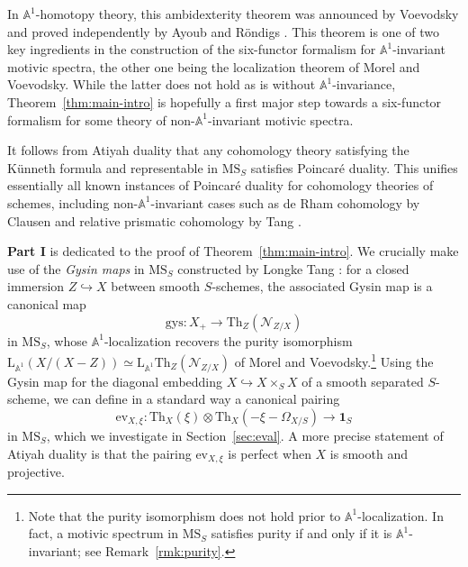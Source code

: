 \documentclass{amsart}
\numberwithin{equation}{section}
\theoremstyle{plain}
\theoremstyle{definition}
\let\scr=\mathcal
\let\bb=\mathbb
\def\A{\bb A}
\def\1{\mathbf 1}
\def\L{\mathrm{L}{}}
\let\into=\hookrightarrow
\def\Th{\mathrm{Th}}
\def\MS{\mathrm{MS}}
\def\ev{\mathrm{ev}}
\def\gys{\mathrm{gys}{}}
\begin{document}
In $\A^1$-homotopy theory, this ambidexterity theorem was announced by Voevodsky \cite{Voevodsky-6FF} and proved independently by Ayoub \cite{Ayoub} and Röndigs \cite{RondigsSH}. This theorem is one of two key ingredients in the construction of the six-functor formalism for $\A^1$-invariant motivic spectra, the other one being the localization theorem of Morel and Voevodsky. While the latter does not hold as is without $\A^1$-invariance, Theorem~\ref{thm:main-intro} is hopefully a first major step towards a six-functor formalism for some theory of non-$\A^1$-invariant motivic spectra.

It follows from Atiyah duality that any cohomology theory satisfying the Künneth formula and representable in $\MS_S$ satisfies Poincaré duality.
This unifies essentially all known instances of Poincaré duality for cohomology theories of schemes, including non-$\A^1$-invariant cases such as de Rham cohomology by Clausen \cite{Cla21} and relative prismatic cohomology by Tang \cite{Tan22}.

\textbf{Part I} is dedicated to the proof of Theorem~\ref{thm:main-intro}.
We crucially make use of the \emph{Gysin maps} in $\MS_S$ constructed by Longke Tang \cite{Tang}: for a closed immersion $Z\into X$ between smooth $S$-schemes, the associated Gysin map is a canonical map
\[
\gys\colon X_+ \to \Th_Z(\scr N_{Z/X})
\]
in $\MS_S$, whose $\A^1$-localization recovers the purity isomorphism $\L_{\A^1}(X/(X-Z))\simeq \L_{\A^1}\Th_Z(\scr N_{Z/X})$ of Morel and Voevodsky.\footnote{Note that the purity isomorphism does not hold prior to $\A^1$-localization. In fact, a motivic spectrum in $\MS_S$ satisfies purity if and only if it is $\A^1$-invariant; see Remark~\ref{rmk:purity}.} Using the Gysin map for the diagonal embedding $X\into X\times_S X$ of a smooth separated $S$-scheme, we can define in a standard way a canonical pairing
\[
\ev_{X,\xi}\colon \Th_X(\xi)\otimes \Th_X(-\xi-\Omega_{X/S}) \to \1_S
\]
in $\MS_S$, which we investigate in Section~\ref{sec:eval}. A more precise statement of Atiyah duality is that the pairing $\ev_{X,\xi}$ is perfect when $X$ is smooth and projective.
\end{document}
